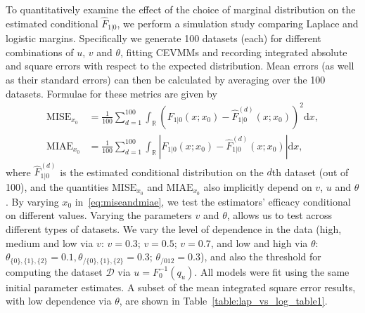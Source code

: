 \documentclass[11pt,twoside,openany]{book}
\newcommand{\md}{\mathrm{d}}
\newcommand{\reals}{\mathbb{R}}
\newcommand{\D}{\mathcal{D}}
\numberwithin{Theorem}{chapter}
\numberwithin{Definition}{chapter}
\numberwithin{Lemma}{chapter}
\numberwithin{Algorithm}{chapter}
\numberwithin{equation}{chapter}
\begin{document}
To quantitatively examine the effect of the choice of marginal distribution
on the estimated conditional $\hat F_{1|0}$, we perform a simulation study
comparing Laplace and logistic margins. Specifically we generate 100 datasets (each)
for different combinations of $u$, $v$ and $\theta$, fitting CEVMMs and
recording integrated absolute and square errors
with respect to the expected distribution. Mean errors (as well as their standard errors) can then be calculated
by averaging over the 100 datasets. Formulae for these metrics are  given by
\begin{equation}\label{eq:miseandmiae}
  \begin{split}
    \text{MISE}_{x_0}&=\frac{1}{100}\sum_{d=1}^{100}\int_\reals \left(F_{1|0}(x;x_0) - \hat F_{1|0}^{(d)}(x;x_0)\right)^2\md x,\\\text{MIAE}_{x_0}&=\frac{1}{100}\sum_{d=1}^{100}\int_\reals \left|F_{1|0}(x;x_0) - \hat F_{1|0}^{(d)}(x;x_0)\right|\md x,
\end{split}
\end{equation}
where $\hat F^{(d)}_{1|0}$ is the estimated conditional distribution on the $d$th dataset (out of 100),
and the quantities $\text{MISE}_{x_0}$ and $\text{MIAE}_{x_0}$ also implicitly depend on $v$, $u$ and $\theta$.
By varying $x_0$ in~\eqref{eq:miseandmiae}, we test the estimators' efficacy
conditional on different values.
Varying the parameters $v$ and $\theta$, allows us to test across
different types of datasets.
We vary the level of dependence in the data (high, medium and low via $v$: $v=0.3$; $v=0.5$; $v=0.7$,
and low and high via $\theta$: $\theta_{\{0\},\{1\},\{2\}}=0.1,\theta_{/\{0\},\{1\},\{2\}}=0.3$; $\theta_{/012}=0.3$),
and also the threshold for computing the dataset $\D$ via $u=F_0^{-1}(q_u)$.
All models were fit using the same initial parameter estimates.
A subset of the mean integrated square error results, with
low dependence via $\theta$, are shown in
Table~\ref{table:lap_vs_log_table1}.
\begin{table}[htp]
  \centering
  \caption{Mean integrated square errors $\pm$ 1 s.d.\ for Laplace and logistic marginals, and for different
parameter combinations. MISEs are multiplied by 100 for readability.\label{table:lap_vs_log_table1}}
\end{table}
\end{document}
